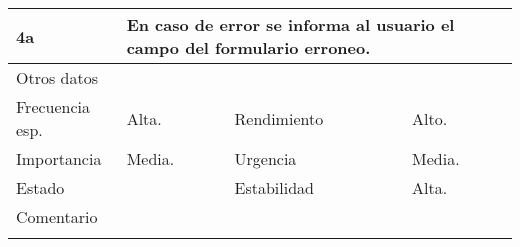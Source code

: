 \documentclass{article}
\begin{document}
\begin{table}[h]
\begin{tabular}{|l|l|l|l|l|l|}
\hline
\multicolumn{1}{|p{1cm}}{4a} & \multicolumn{5}{|p{9cm}|}{En caso de error se informa al usuario el campo del formulario erroneo.}\\
\hline
\multicolumn{6}{|p{10cm}|}{Otros datos}\\
\hline
\multicolumn{1}{|p{2cm}|}{Frecuencia esp.} & \multicolumn{2}{p{3cm}}{Alta.} & \multicolumn{1}{|p{2cm}|}{Rendimiento} & \multicolumn{2}{p{3cm}|}{Alto.}\\
\hline
\multicolumn{1}{|p{2cm}|}{Importancia} & \multicolumn{2}{p{3cm}}{Media.} & \multicolumn{1}{|p{2cm}|}{Urgencia} & \multicolumn{2}{p{3cm}|}{Media.}\\
\hline
\multicolumn{1}{|p{2cm}|}{Estado} & \multicolumn{2}{p{3cm}}{} & \multicolumn{1}{|p{2cm}|}{Estabilidad} & \multicolumn{2}{p{3cm}|}{Alta.}\\
\hline
\multicolumn{6}{|p{10cm}|}{Comentario}\\
\hline
\multicolumn{6}{|p{10cm}|}{}\\
\hline
\end{tabular}
\end{table}
\end{document}

